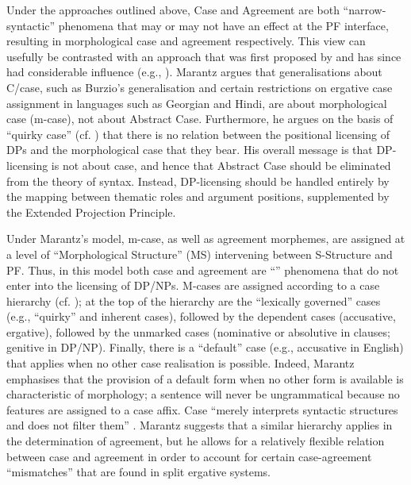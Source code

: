 \documentclass[output=paper]{langsci/langscibook}
\begin{document}
Under the approaches outlined above, Case and Agreement are both ``narrow-syntactic'' phenomena that may or may not have an effect at the PF interface, resulting in morphological case and agreement respectively. This view can usefully be contrasted with an approach that was first proposed by \citet{Marantz1991} and has since had considerable influence (e.g., \citealt{Harley1995,Schütze1997,McFadden2004,Bobaljik2008Phi,Baker2010,Titov2012}). Marantz argues that generalisations about C\slash case, such as Burzio’s generalisation \citep{Burzio1986} and certain restrictions on ergative case assignment in languages such as Georgian and Hindi, are about morphological case (m-case), not about Abstract Case. Furthermore, he argues on the basis of  ``quirky case'' (cf. \citealt{Zaenen1985}) that there is no relation between the positional licensing of DPs and the morphological case that they bear. His overall message is that DP-licensing is not about case, and hence that Abstract Case should be eliminated from the theory of syntax. Instead, DP-licensing should be handled entirely by the mapping between thematic roles and argument positions, supplemented by the Extended Projection Principle.

Under Marantz’s model, m-case, as well as agreement morphemes, are assigned at a level of ``Morphological Structure'' (MS) intervening between S-Structure and PF. Thus, in this model both case and agreement are ``'' phenomena that do not enter into the licensing of DP\slash NPs. M-cases are assigned according to a case hierarchy (cf. \citealt{Yip1987}); at the top of the hierarchy are the ``lexically governed'' cases (e.g., ``quirky'' and inherent cases), followed by the dependent cases (accusative, ergative), followed by the unmarked cases (nominative or absolutive in clauses; genitive in DP\slash NP). Finally, there is a ``default'' case (e.g., accusative in English) that applies when no other case realisation is possible. Indeed, Marantz emphasises that the provision of a default form when no other form is available is characteristic of morphology; a sentence will never be ungrammatical because no features are assigned to a case affix. Case “merely interprets syntactic structures and does not filter them” \citep[24]{Marantz1991}. Marantz suggests that a similar hierarchy applies in the determination of agreement, but he allows for a relatively flexible relation between case and agreement in order to account for certain case-agreement ``mismatches'' that are found in split ergative systems.
\end{document}
